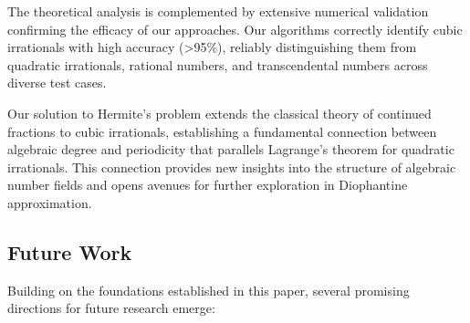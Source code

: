 The theoretical analysis is complemented by extensive numerical validation confirming the efficacy of our approaches. Our algorithms correctly identify cubic irrationals with high accuracy (>95\%), reliably distinguishing them from quadratic irrationals, rational numbers, and transcendental numbers across diverse test cases.

Our solution to Hermite's problem extends the classical theory of continued fractions to cubic irrationals, establishing a fundamental connection between algebraic degree and periodicity that parallels Lagrange's theorem for quadratic irrationals. This connection provides new insights into the structure of algebraic number fields and opens avenues for further exploration in Diophantine approximation.

\subsection{Future Work}

Building on the foundations established in this paper, several promising directions for future research emerge:

